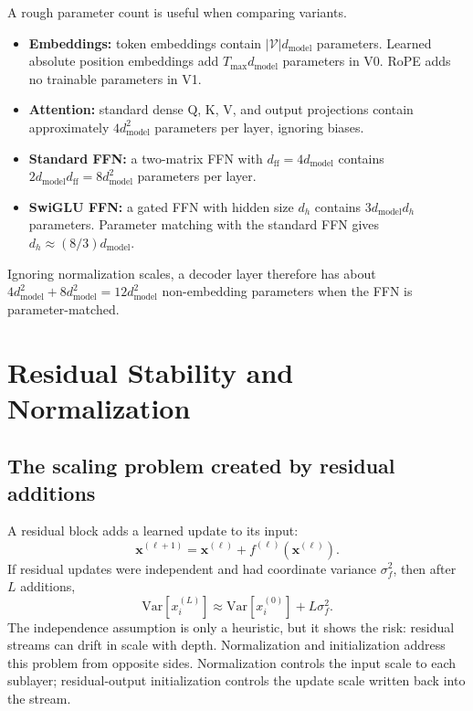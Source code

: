 \documentclass[11pt,a4paper]{article}
\theoremstyle{definition}
\theoremstyle{plain}
\newcommand{\vx}{\bm{x}}
\newcommand{\Var}{\mathrm{Var}}
\newcommand{\dmodel}{d_{\mathrm{model}}}
\newcommand{\dff}{d_{\mathrm{ff}}}
\newcommand{\vocab}{|\mathcal{V}|}
\begin{document}
A rough parameter count is useful when comparing variants.
\begin{itemize}[nosep]
    \item \textbf{Embeddings:} token embeddings contain $\vocab\dmodel$ parameters. Learned absolute position embeddings add $T_{\max}\dmodel$ parameters in V0. RoPE adds no trainable parameters in V1.
    \item \textbf{Attention:} standard dense Q, K, V, and output projections contain approximately $4\dmodel^2$ parameters per layer, ignoring biases.
    \item \textbf{Standard FFN:} a two-matrix FFN with $\dff=4\dmodel$ contains $2\dmodel\dff=8\dmodel^2$ parameters per layer.
    \item \textbf{SwiGLU FFN:} a gated FFN with hidden size $d_h$ contains $3\dmodel d_h$ parameters. Parameter matching with the standard FFN gives $d_h\approx(8/3)\dmodel$.
\end{itemize}
Ignoring normalization scales, a decoder layer therefore has about $4\dmodel^2+8\dmodel^2=12\dmodel^2$ non-embedding parameters when the FFN is parameter-matched.

\section{Residual Stability and Normalization}
\label{sec:normalization}

\subsection{The scaling problem created by residual additions}

A residual block adds a learned update to its input:
\begin{equation}\label{eq:residual}
    \vx^{(\ell+1)}=\vx^{(\ell)}+f^{(\ell)}(\vx^{(\ell)}).
\end{equation}
If residual updates were independent and had coordinate variance $\sigma_f^2$, then after $L$ additions,
\begin{equation}
    \Var[x_i^{(L)}]\approx \Var[x_i^{(0)}]+L\sigma_f^2.
\end{equation}
The independence assumption is only a heuristic, but it shows the risk: residual streams can drift in scale with depth. Normalization and initialization address this problem from opposite sides. Normalization controls the input scale to each sublayer; residual-output initialization controls the update scale written back into the stream.
\end{document}
